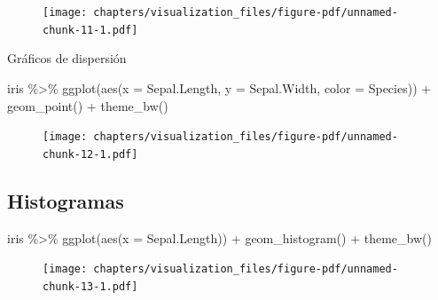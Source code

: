 \documentclass[
  letterpaper,
  DIV=11,
  numbers=noendperiod]{scrreprt}
\newenvironment{Shaded}{\begin{snugshade}}{\end{snugshade}}
\newcommand{\AttributeTok}[1]{\textcolor[rgb]{0.40,0.45,0.13}{#1}}
\newcommand{\FunctionTok}[1]{\textcolor[rgb]{0.28,0.35,0.67}{#1}}
\newcommand{\NormalTok}[1]{\textcolor[rgb]{0.00,0.23,0.31}{#1}}
\newcommand{\SpecialCharTok}[1]{\textcolor[rgb]{0.37,0.37,0.37}{#1}}
\begin{document}
\begin{figure}[H]

{\centering \texttt{[image: chapters/visualization\_files/figure-pdf/unnamed-chunk-11-1.pdf]}

}

\end{figure}

Gráficos de dispersión

\begin{Shaded}
\begin{Highlighting}[]
\NormalTok{iris }\SpecialCharTok{\%\textgreater{}\%} 
  \FunctionTok{ggplot}\NormalTok{(}\FunctionTok{aes}\NormalTok{(}\AttributeTok{x =}\NormalTok{ Sepal.Length, }\AttributeTok{y =}\NormalTok{ Sepal.Width, }\AttributeTok{color =}\NormalTok{ Species)) }\SpecialCharTok{+}
  \FunctionTok{geom\_point}\NormalTok{() }\SpecialCharTok{+}
  \FunctionTok{theme\_bw}\NormalTok{()}
\end{Highlighting}
\end{Shaded}

\begin{figure}[H]

{\centering \texttt{[image: chapters/visualization\_files/figure-pdf/unnamed-chunk-12-1.pdf]}

}

\end{figure}

\hypertarget{histogramas}{%
\subsection{Histogramas}\label{histogramas}}

\begin{Shaded}
\begin{Highlighting}[]
\NormalTok{iris }\SpecialCharTok{\%\textgreater{}\%} 
  \FunctionTok{ggplot}\NormalTok{(}\FunctionTok{aes}\NormalTok{(}\AttributeTok{x =}\NormalTok{ Sepal.Length)) }\SpecialCharTok{+}
  \FunctionTok{geom\_histogram}\NormalTok{() }\SpecialCharTok{+}
  \FunctionTok{theme\_bw}\NormalTok{()}
\end{Highlighting}
\end{Shaded}

\begin{figure}[H]

{\centering \texttt{[image: chapters/visualization\_files/figure-pdf/unnamed-chunk-13-1.pdf]}

}

\end{figure}
\end{document}
